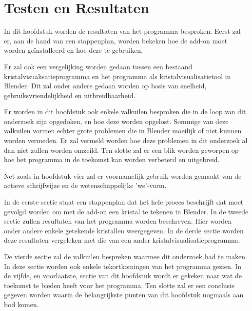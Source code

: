 

\chapter{Testen en Resultaten}  

In dit hoofdstuk worden de resultaten van het programma besproken. Eerst zal er, aan de hand van een stappenplan, worden bekeken hoe de add-on moet worden geïnstalleerd en hoe deze te gebruiken.
\par
Er zal ook een vergelijking worden gedaan tussen een bestaand kristalvisualisatieprogramma en het programma als kristalvisualisatietool in Blender. Dit zal onder andere gedaan worden op basis van snelheid, gebruiksvriendelijkheid en uitbreidbaarheid.
\par
Er worden in dit hoofdstuk ook enkele valkuilen besproken die in de loop van dit onderzoek zijn opgedoken, en hoe deze worden opgelost. Sommige van deze valkuilen vormen echter grote problemen die in Blender moeilijk of niet kunnen worden vermeden. Er zal vermeld worden hoe deze problemen in dit onderzoek al dan niet zullen worden omzeild. Ten slotte zal er een blik worden geworpen op hoe het programma in de toekomst kan worden verbeterd en uitgebreid.
\par
Net zoals in hoofdstuk vier zal er voornamelijk gebruik worden gemaakt van de actieve schrijfwijze en de wetenschappelijke 'we'-vorm. 
\par 
In de eerste sectie staat een stappenplan dat het hele proces beschrijft dat moet gevolgd worden om met de add-on een kristal te tekenen in Blender. In de tweede sectie zullen resultaten van het programma worden beschreven. Hier worden onder andere enkele getekende kristallen weergegeven. In de derde sectie worden deze resultaten vergeleken met die van een ander kristalvisualisatieprogramma. 
\par
De vierde sectie zal de valkuilen bespreken waarmee dit onderzoek had te maken. In deze sectie worden ook enkele tekortkomingen van het programma gezien. In de vijfde, en voorlaatste, sectie van dit hoofdstuk wordt er gekeken naar wat de toekomst te bieden heeft voor het programma. Ten slotte zal er een conclusie gegeven worden waarin de belangrijkste punten van dit hoofdstuk nogmaals aan bod komen.   


